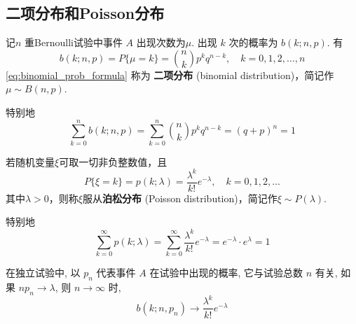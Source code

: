 \subsection{二项分布和Poisson分布}\label{subsec:二项分布和Poisson分布}
\begin{definition}[二项分布]\label{def:二项分布}
    记$n$ 重Bernoulli试验中事件 $A$ 出现次数为$\mu$. 出现 $k$ 次的概率为 $b(k;n,p)$. 有
    \begin{equation} \label{eq:binomial_prob_formula}
b(k;n,p) = P\{\mu = k\} = \binom{n}{k} p^k q^{n-k}, \quad k=0,1,2,\ldots,n
\end{equation}\eqref{eq:binomial_prob_formula} 称为 \textbf{二项分布} (binomial distribution)，简记作$\mu\sim B(n,p)$.
\end{definition}
\begin{remark}
    特别地
\begin{equation} \label{eq:binomial_sum_to_one}
\sum_{k=0}^n b(k;n,p) = \sum_{k=0}^n \binom{n}{k} p^k q^{n-k} = (q+p)^n = 1
\end{equation}
\end{remark}
\begin{definition}[Poisson分布]\label{def:Poisson分布}
若随机变量$\xi$可取一切非负整数值，且
    \begin{equation} \label{eq:poisson_pmf}
P\{\xi = k\} =p(k;\lambda) = \frac{\lambda^k}{k!}e^{-\lambda}, \quad k = 0,1,2,\ldots
\end{equation}
其中$\lambda>0$，则称$\xi$服从\textbf{泊松分布} (Poisson distribution)，简记作$\xi\sim P(\lambda)$.
\end{definition}
\begin{remark}
    特别地
\begin{equation} \label{eq:poisson_sum_to_one}
\sum_{k=0}^\infty p(k;\lambda) = \sum_{k=0}^\infty \frac{\lambda^k}{k!}e^{-\lambda} = e^{-\lambda} \cdot e^\lambda = 1
\end{equation}
\end{remark}
\begin{theorem} \label{thm:poisson_theorem}
在独立试验中, 以 $p_n$ 代表事件 $A$ 在试验中出现的概率, 它与试验总数 $n$ 有关, 如果 $np_n \to \lambda$, 则 $n\to\infty$ 时,
\[
b(k;n,p_n) \to \frac{\lambda^k}{k!}e^{-\lambda}
\]
\end{theorem}


